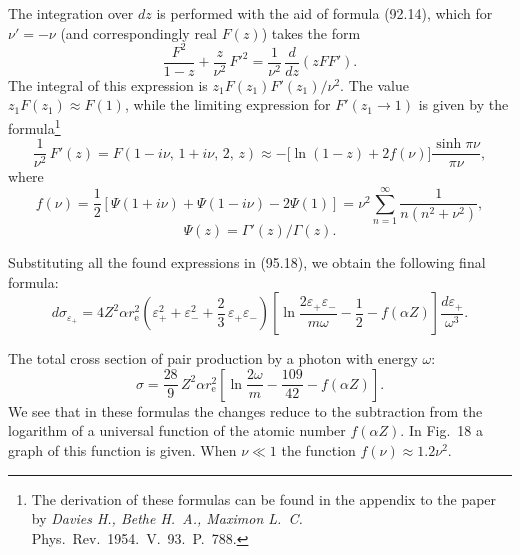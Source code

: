 
The integration over $dz$ is performed with the aid of formula (92.14), which for $\nu' = -\nu$ (and correspondingly real $F(z)$) takes the form
\[
\frac{F^2}{1-z} + \frac{z}{\nu^2}\,F'^2 = \frac{1}{\nu^2}\,\frac{d}{dz}(zFF').
\]
The integral of this expression is $z_1 F(z_1)F'(z_1)/\nu^2$. The value $z_1 F(z_1) \approx F(1)$, while the limiting expression for $F'(z_1 \to 1)$ is given by the formula\footnote{The derivation of these formulas can be found in the appendix to the paper by \emph{Davies H., Bethe H.~A., Maximon L.~C.}\/\/ Phys.\ Rev.\ 1954.\ V.~93.\ P.~788.}
\[
\frac{1}{\nu^2}\,F'(z) = F(1-i\nu,\,1+i\nu,\,2,\,z) \approx -\bigl[\ln(1-z) + 2f(\nu)\bigr]\frac{\sinh\pi\nu}{\pi\nu},
\]
where
\begin{equation}
f(\nu) = \frac{1}{2}[\Psi(1+i\nu) + \Psi(1-i\nu) - 2\Psi(1)] = \nu^2\sum_{n=1}^{\infty}\frac{1}{n(n^2+\nu^2)},
\label{eq:95.19}
\end{equation}
\[
\Psi(z) = \Gamma'(z)/\Gamma(z).
\]

Substituting all the found expressions in (95.18), we obtain the following final formula:
\begin{equation}
d\sigma_{\varepsilon_+} = 4Z^2\alpha r_\mathrm{e}^2\!\left(\varepsilon_+^2 + \varepsilon_-^2 + \frac{2}{3}\,\varepsilon_+\varepsilon_-\right)\!\left[\ln\frac{2\varepsilon_+\varepsilon_-}{m\omega} - \frac{1}{2} - f(\alpha Z)\right]\frac{d\varepsilon_+}{\omega^3}.
\label{eq:95.20}
\end{equation}


The total cross section of pair production by a photon with energy $\omega$:
\begin{equation}
\sigma = \frac{28}{9}\,Z^2\alpha r_\mathrm{e}^2\!\left[\ln\frac{2\omega}{m} - \frac{109}{42} - f(\alpha Z)\right].
\label{eq:95.21}
\end{equation}
We see that in these formulas the changes reduce to the subtraction from the logarithm of a universal function of the atomic number $f(\alpha Z)$. In Fig.~18 a graph of this function is given. When $\nu \ll 1$ the function $f(\nu) \approx 1.2\nu^2$.
